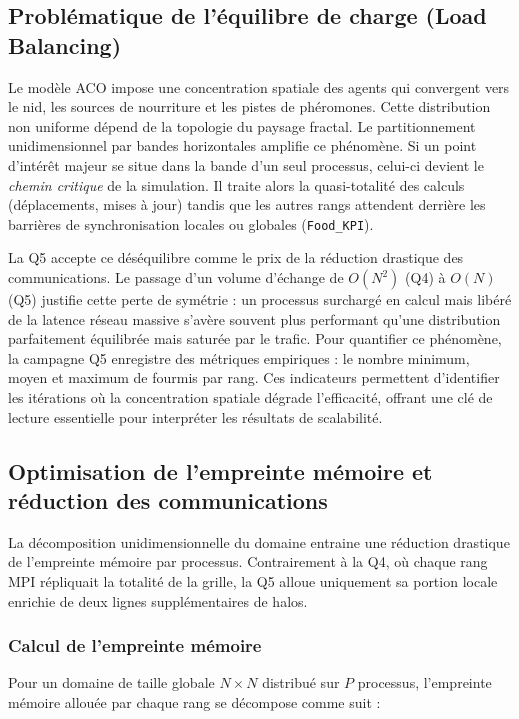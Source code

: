 \documentclass[11pt,a4paper]{article}
\begin{document}
\subsection{Problématique de l'équilibre de charge (Load Balancing)}
Le modèle ACO impose une concentration spatiale des agents qui convergent vers le nid, les sources de nourriture et les pistes de phéromones. Cette distribution non uniforme dépend de la topologie du paysage fractal.
Le partitionnement unidimensionnel par bandes horizontales amplifie ce phénomène. Si un point d'intérêt majeur se situe dans la bande d'un seul processus, celui-ci devient le \emph{chemin critique} de la simulation. Il traite alors la quasi-totalité des calculs (déplacements, mises à jour) tandis que les autres rangs attendent derrière les barrières de synchronisation locales ou globales (\texttt{Food\_KPI}).

La Q5 accepte ce déséquilibre comme le prix de la réduction drastique des communications. Le passage d'un volume d'échange de $O(N^2)$ (Q4) à $O(N)$ (Q5) justifie cette perte de symétrie : un processus surchargé en calcul mais libéré de la latence réseau massive s'avère souvent plus performant qu'une distribution parfaitement équilibrée mais saturée par le trafic.
Pour quantifier ce phénomène, la campagne Q5 enregistre des métriques empiriques : le nombre minimum, moyen et maximum de fourmis par rang. Ces indicateurs permettent d'identifier les itérations où la concentration spatiale dégrade l'efficacité, offrant une clé de lecture essentielle pour interpréter les résultats de scalabilité.


\subsection{Optimisation de l'empreinte mémoire et réduction des communications}

La décomposition unidimensionnelle du domaine entraine une réduction drastique de l'empreinte mémoire par processus. Contrairement à la Q4, où chaque rang MPI répliquait la totalité de la grille, la Q5 alloue uniquement sa portion locale enrichie de deux lignes supplémentaires de halos.

\subsubsection{Calcul de l'empreinte mémoire}

Pour un domaine de taille globale $N \times N$ distribué sur $P$ processus, l'empreinte mémoire allouée par chaque rang se décompose comme suit :
\end{document}
